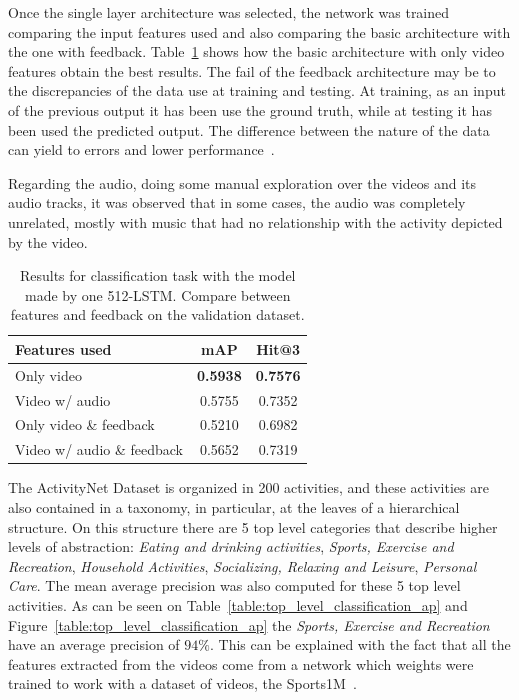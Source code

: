 Once the single layer architecture was selected, the network was trained comparing the input features used and also comparing the basic architecture with the one with feedback.  Table~\ref{table:classification_by_features} shows how the basic architecture  with only video features obtain the best results.
The fail of the feedback architecture may be to the discrepancies of the data use at training and testing. At training, as an input of the previous output it has been use the ground truth, while at testing it has been used the predicted output. The difference between the nature of the data can yield to errors and lower performance~\cite{bengio2015scheduled}.

Regarding the audio, doing some manual exploration over the videos and its audio tracks, it was observed that in some cases, the audio was completely unrelated, mostly with music that had no relationship with the activity depicted by the video.

\begin{table}[H]
\begin{center}
\begin{tabular}{|l|c|c|}
\hline
\textbf{Features used} & \textbf{mAP} & \textbf{Hit@3} \\
\hline\hline
Only video & \bf0.5938 & \bf0.7576 \\
Video w/ audio & 0.5755 & 0.7352 \\
Only video \& feedback & 0.5210 & 0.6982 \\
Video w/ audio \& feedback & 0.5652 & 0.7319 \\
\hline
\end{tabular}
\end{center}
\caption{Results for classification task with the model made by one 512-LSTM. Compare between
         features and feedback on the validation dataset.}
\label{table:classification_by_features}
\end{table}

The ActivityNet Dataset is organized in 200 activities, and these activities are also contained in a taxonomy, in particular, at the leaves of a hierarchical structure.
On this structure there are 5 top level categories that describe higher levels of abstraction: \textit{Eating and drinking activities}, \textit{Sports, Exercise and Recreation}, \textit{Household Activities}, \textit{Socializing, Relaxing and Leisure}, \textit{Personal Care}.
The mean average precision was also computed for these 5 top level activities.
As can be seen on Table~\ref{table:top_level_classification_ap} and Figure~\ref{table:top_level_classification_ap} the \textit{Sports, Exercise and Recreation} have an average precision of $94\%$. This can be explained with the fact that all the features extracted from the videos come from a network which weights were trained to work with a dataset of videos, the Sports1M~\cite{KarpathyCVPR14}.

